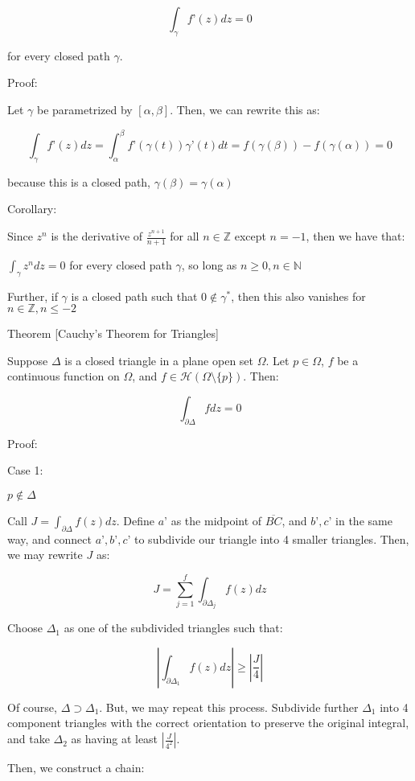 \documentclass[10pt]{article}
\begin{document}
$$\int_\gamma f’(z) dz = 0$$

for every closed path $\gamma$. 

Proof:

Let $\gamma$ be parametrized by $[\alpha,\beta]$. Then, we can rewrite this as:

$$ \int_\gamma f’(z)dz = \int_\alpha^\beta f’(\gamma(t)) \gamma’(t) dt = f(\gamma(\beta)) - f(\gamma(\alpha)) = 0$$

because this is a closed path, $\gamma(\beta) = \gamma(\alpha)$

Corollary:

Since $z^n$ is the derivative of $\frac{z^{n+1}}{n+1}$ for all $n \in \mathbb{Z}$ except $n = -1$, then we have that:


$\int_\gamma z^n dz = 0$ for every closed path $\gamma$, so long as $n \geq 0, n \in \mathbb{N}$

Further, if $\gamma$ is a closed path such that $0 \not \in \gamma^*$, then this also vanishes for $n \in \mathbb{Z}, n \leq -2$ 

Theorem [Cauchy’s Theorem for Triangles]

Suppose $\Delta$ is a closed triangle in a plane open set $\Omega$. Let $p \in \Omega$, $f$ be a continuous function on $\Omega$, and $f \in \mathcal{H}(\Omega \setminus \{ p \})$. Then:

$$ \int_{\partial \Delta} f dz = 0 $$

Proof:

Case 1:

$ p \not \in \Delta$

Call $J = \int_{\partial \Delta} f(z) dz $. Define $a’$ as the midpoint of $\overline{BC}$, and $b’,c’$ in the same way, and connect $a’,b’,c’$ to subdivide our triangle into 4 smaller triangles. Then, we may rewrite $J$ as:

$$J = \sum_{j=1}^f \int_{\partial \Delta_j} f(z) dz$$

Choose $\Delta_1$ as one of the subdivided triangles such that:

$$ \left| \int_{\partial\Delta_1} f(z) dz \right| \geq \left| \frac{J}{4} \right| $$

Of course, $\Delta \supset \Delta_1$. But, we may repeat this process. Subdivide further $\Delta_1$ into 4 component triangles with the correct orientation to preserve the original integral, and take $\Delta_2$ as having at least $\left| \frac{J}{4^2} \right|$.

Then, we construct a chain:
\end{document}
